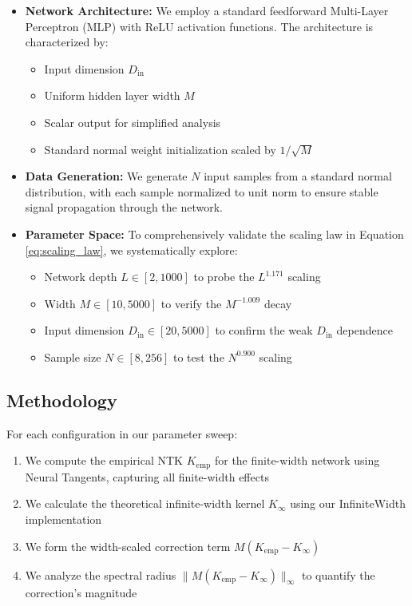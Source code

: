 \documentclass{article}
\begin{document}
\begin{itemize}
    \item \textbf{Network Architecture:} We employ a standard feedforward Multi-Layer Perceptron (MLP) with ReLU activation functions. The architecture is characterized by:
    \begin{itemize}
        \item Input dimension $D_{\text{in}}$
        \item Uniform hidden layer width $M$
        \item Scalar output for simplified analysis
        \item Standard normal weight initialization scaled by $1/\sqrt{M}$
    \end{itemize}

    \item \textbf{Data Generation:} We generate $N$ input samples from a standard normal distribution, with each sample normalized to unit norm to ensure stable signal propagation through the network.

    \item \textbf{Parameter Space:} To comprehensively validate the scaling law in Equation \ref{eq:scaling_law}, we systematically explore:
    \begin{itemize}
        \item Network depth $L \in [2, 1000]$ to probe the $L^{1.171}$ scaling
        \item Width $M \in [10, 5000]$ to verify the $M^{-1.009}$ decay
        \item Input dimension $D_{\text{in}} \in [20, 5000]$ to confirm the weak $D_{\text{in}}$ dependence
        \item Sample size $N \in [8, 256]$ to test the $N^{0.900}$ scaling
    \end{itemize}
\end{itemize}

\subsection{Methodology}

For each configuration in our parameter sweep:

\begin{enumerate}
    \item We compute the empirical NTK $K_{\text{emp}}$ for the finite-width network using Neural Tangents, capturing all finite-width effects
    \item We calculate the theoretical infinite-width kernel $K_{\infty}$ using our InfiniteWidth implementation
    \item We form the width-scaled correction term $M(K_{\text{emp}} - K_{\infty})$
    \item We analyze the spectral radius $\|M(K_{\text{emp}} - K_{\infty})\|_\infty$ to quantify the correction's magnitude
\end{enumerate}
\end{document}
